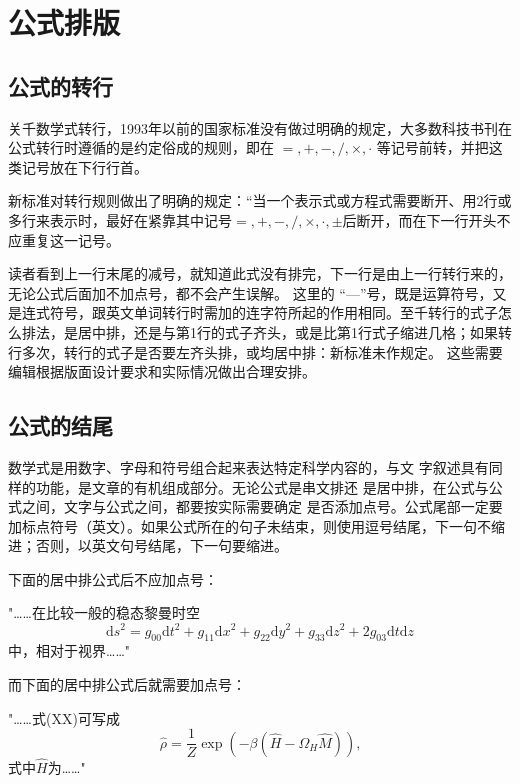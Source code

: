 \section{公式排版}
\subsection{公式的转行}
关千数学式转行，1993年以前的国家标准没有做过明确的规定，大多数科技书刊在公式转行时遵循的是约定俗成的规则，即在 $=,+,-,/,\times,\cdot$ 等记号前转，并把这类记号放在下行行首。 

新标准对转行规则做出了明确的规定：“当一个表示式或方程式需要断开、用2行或多行来表示时，最好在紧靠其中记号$=,+,-,/,\times,\cdot,\pm$后断开，而在下一行开头不应重复这一记号。

读者看到上一行末尾的减号，就知道此式没有排完，下一行是由上一行转行来的，无论公式后面加不加点号，都不会产生误解。 这里的 “—”号，既是运算符号，又是连式符号，跟英文单词转行时需加的连字符所起的作用相同。至千转行的式子怎么排法，是居中排，还是与第1行的式子齐头，或是比第1行式子缩进几格；如果转行多次，转行的式子是否要左齐头排，或均居中排：新标准未作规定。 这些需要编辑根据版面设计要求和实际情况做出合理安排。




\subsection{公式的结尾}
数学式是用数字、字母和符号组合起来表达特定科学内容的，与文 字叙述具有同样的功能，是文章的有机组成部分。无论公式是串文排还 是居中排，在公式与公式之间，文字与公式之间，都要按实际需要确定 是否添加点号。公式尾部一定要加标点符号（英文）。如果公式所在的句子未结束，则使用逗号结尾，下一句不缩进；否则，以英文句号结尾，下一句要缩进。

下面的居中排公式后不应加点号：
\begin{example}
"……在比较一般的稳态黎曼时空
\begin{equation}
\mathrm{d} s^2 = g_{00} \mathrm{d} t^2  +  g_{11} \mathrm{d} x^2  +  g_{22} \mathrm{d} y^2  +  g_{33} \mathrm{d} z^2   +  2g_{03} \mathrm{d} t \mathrm{d} z  
\end{equation}
中，相对于视界……"
\end{example}

而下面的居中排公式后就需要加点号：
\begin{example}
"……式(XX)可写成
\begin{equation}
\hat{\rho} = \frac{1}{Z} \exp(-\beta ( \hat{H} - \Omega_{H} \hat{M})) \mbox{,}
\end{equation}
式中$\hat{H}$为……"
\end{example}


